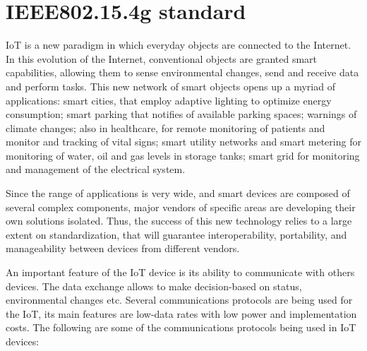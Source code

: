\chapter{IEEE802.15.4g standard }

IoT is a new paradigm in which everyday objects are connected to the Internet. In this evolution of the Internet, conventional objects are granted smart capabilities, allowing them to sense environmental changes, send and receive data and perform tasks. This new network of smart objects opens up a myriad of applications: smart cities, that employ adaptive lighting to optimize energy consumption; smart parking that notifies of available parking spaces; warnings of climate changes; also in healthcare, for remote monitoring of patients and monitor and tracking of vital signs; smart utility networks and smart metering for monitoring of water, oil and gas levels in storage tanks; smart grid for monitoring and management of the electrical system. 

Since the range of applications is very wide, and smart devices are composed of several complex components, major vendors of specific areas are developing their own solutions isolated. Thus, the success of this new technology relies to a large extent on standardization, that will guarantee interoperability, portability, and manageability between devices from different vendors. 

An important feature of the IoT device is its ability to communicate with others devices. The data exchange allows to make decision-based on status, environmental changes etc. Several communications protocols are being used for the IoT, its main features are low-data rates with low power and implementation costs. The following are some of the communications protocols being used in IoT devices:


